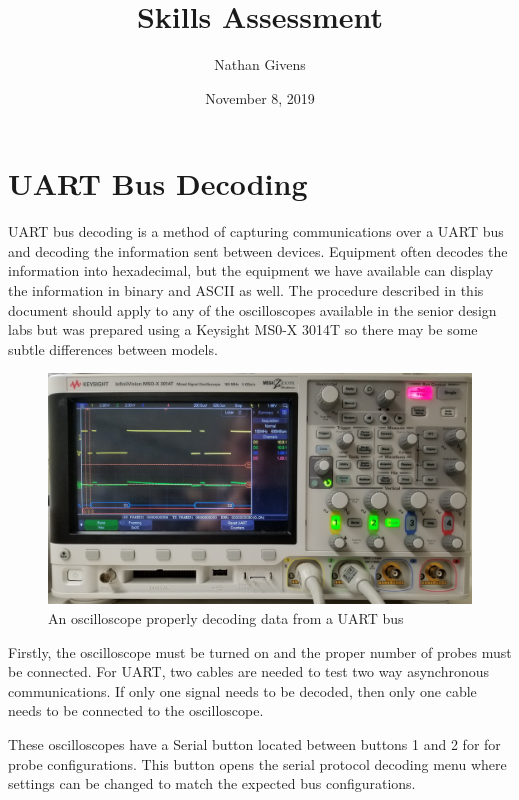 \documentclass{article}
\title{Skills Assessment}
\author{Nathan Givens}
\date{November 8, 2019}
\begin{document}
  \maketitle

  \section*{UART Bus Decoding}

  UART bus decoding is a method of capturing communications over a UART bus and
  decoding the information sent between devices. Equipment often decodes the
  information into hexadecimal, but the equipment we have available can display
  the information in binary and ASCII as well. The procedure described in this
  document should apply to any of the oscilloscopes available in the senior
  design labs but was prepared using a Keysight MS0-X 3014T so there may be
  some subtle differences between models.

  \begin{figure}[h]
    \includegraphics[width=\textwidth]{full_scope}
    \caption{An oscilloscope properly decoding data from a UART bus}
  \end{figure}

  Firstly, the oscilloscope must be turned on and the proper number of probes
  must be connected. For UART, two cables are needed to test two way
  asynchronous communications. If only one signal needs to be decoded, then only
  one cable needs to be connected to the oscilloscope.

  These oscilloscopes have a Serial button located between buttons 1 and 2
  for for probe configurations. This button opens the serial protocol decoding
  menu where settings can be changed to match the expected bus configurations.
\end{document}
